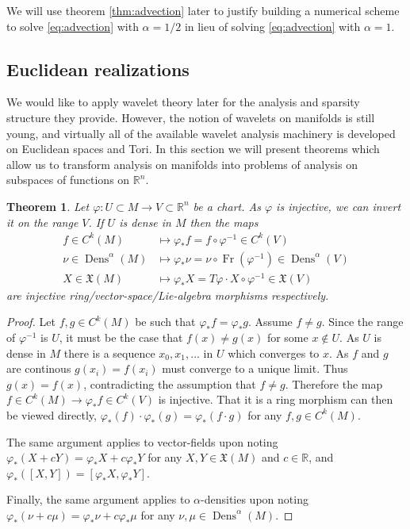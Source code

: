 \documentclass[letterpaper, 10 pt, conference]{ieeeconf}
\newcommand{\R}{\mathbb{R}}
\newtheorem{thm}{Theorem}[section]
\DeclareMathOperator{\Fr}{Fr}
\DeclareMathOperator{\Dens}{Dens}
\begin{document}
  We will use theorem \ref{thm:advection} later to justify building
  a numerical scheme to solve \eqref{eq:advection} with $\alpha = 1/2$
  in lieu of solving \eqref{eq:advection} with $\alpha = 1$.

\subsection{Euclidean realizations}
\label{sec:euclidean}
  We would like to apply wavelet theory later for the
  analysis and sparsity structure they provide.
  However, the notion of wavelets on manifolds is still young,
  and virtually all of the available wavelet analysis machinery
  is developed on Euclidean spaces and Tori.
  In this section we will present theorems which allow
  us to transform analysis on manifolds into problems
  of analysis on subspaces of functions on $\R^n$.

\begin{thm}
  \label{thm:Euclidean}
  Let $\varphi:U \subset M \to V \subset \R^n$ be a chart.
  As $\varphi$ is injective, we can invert it on the range $V$.
  If $U$ is dense in $M$ then the maps
  \begin{align*}
    f \in C^k(M) &\mapsto \varphi_*f = f \circ \varphi^{-1} \in C^k(V) \\
    \nu \in \Dens^\alpha(M) &\mapsto \varphi_* \nu = \nu \circ \Fr(\varphi^{-1}) \in \Dens^\alpha(V) \\
    X \in \mathfrak{X}(M) &\mapsto \varphi_* X = T\varphi \cdot X \circ \varphi^{-1} \in \mathfrak{X}(V)
  \end{align*}
  are injective ring/vector-space/Lie-algebra morphisms respectively.
  \end{thm}
  \begin{proof}
    Let $f,g \in C^k(M)$ be such that $\varphi_* f = \varphi_*g$.
    Assume $f \neq g$.
    Since the range of $\varphi^{-1}$ is $U$, it must be the case that
    $f(x) \neq g(x)$ for some $x \notin U$.
    As $U$ is dense in $M$ there is a sequence $x_0,x_1,\dots$ in $U$
    which converges to $x$.
    As $f$ and $g$ are continous $g(x_i) = f(x_i)$ must converge to a
    unique limit.  Thus $g(x) = f(x)$, contradicting the assumption
    that $f \neq g$.
    Therefore the map $f \in C^k(M) \to \varphi_* f \in C^k(V)$
    is injective.
    That it is a ring morphism can then be viewed directly, $\varphi_*(f) \cdot \varphi_*(g) = \varphi_*(f \cdot g)$ for any $f,g \in C^k(M)$.
    
    The same argument applies to vector-fields
    upon noting $\varphi_*(X+cY) = \varphi_*X + c \varphi_*Y$ for any $X,Y \in \mathfrak{X}(M)$ and $c \in \R$, and $\varphi_*([X,Y]) = [\varphi_*X, \varphi_*Y]$.

    Finally, the same argument applies to $\alpha$-densities
    upon noting $\varphi_*( \nu + c \mu) = \varphi_*\nu + c \varphi_* \mu$ for any $\nu,\mu \in \Dens^\alpha(M)$.
  \end{proof}
  
\end{document}
